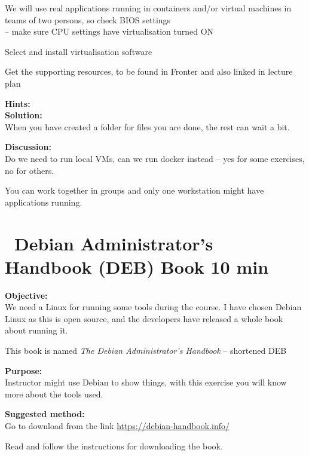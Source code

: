 \documentclass[a4paper,11pt,notitlepage]{report}
\begin{document}
\begin{list2}
\item[\faSquareO] We will use real applications running in containers and/or virtual machines in teams of two persons, so check BIOS settings\\
-- make sure CPU settings have virtualisation turned ON
\item[\faSquareO] Select and install virtualisation software
\item[\faSquareO] Get the supporting resources, to be found in Fronter and also linked in lecture plan
\end{list2}


{\bf Hints:}\\

{\bf Solution:}\\
When you have created a folder for files you are done, the rest can wait a bit.

{\bf Discussion:}\\
Do we need to run local VMs, can we run docker instead -- yes for some exercises, no for others.

You can work together in groups and only one workstation might have applications running.



\chapter{\faInfoCircle\ Debian Administrator's Handbook (DEB) Book 10 min}
\label{ex:sw-downloadDEB}



{\bf Objective:}\\
We need a Linux for running some tools during the course. I have chosen Debian Linux as this is open source, and the developers have released a whole book about running it.

This book is named
\emph{The Debian Administrator's Handbook}  -- shortened DEB

{\bf Purpose:}\\
Instructor might use Debian to show things, with this exercise you will know more about the tools used.


{\bf Suggested method:}\\
Go to download from the link \url{https://debian-handbook.info/}

Read and follow the instructions for downloading the book.
\end{document}
